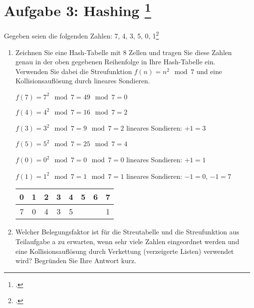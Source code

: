 \documentclass{lehramt-informatik-aufgabe}
\begin{document}
\section{Aufgabe 3: Hashing
\footcite[Seite 2]{aud:pu:5}
}

Gegeben seien die folgenden Zahlen: 7, 4, 3, 5, 0, 1\footcite[Frühjahr
2005, Thema 2 A 8]{examen:66112:2005:03}

\begin{enumerate}


\item Zeichnen Sie eine Hash-Tabelle mit 8 Zellen und tragen Sie diese
Zahlen genau in der oben gegebenen Reihenfolge in Ihre Hash-Tabelle ein.
Verwenden Sie dabei die Streufunktion $f(n) = n^2 \mod 7$ und eine
Kollisionsauflösung durch lineares Sondieren.

\begin{antwort}
{
\footnotesize
$f(7) = 7^2 \mod 7 = 49 \mod 7 = 0$

$f(4) = 4^2 \mod 7 = 16 \mod 7 = 2$

$f(3) = 3^2 \mod 7 = 9 \mod 7 = 2$ lineares Sondieren: $+1 = 3$

$f(5) = 5^2 \mod 7 = 25 \mod 7 = 4$

$f(0) = 0^2 \mod 7 = 0 \mod 7 = 0$ lineares Sondieren: $+1 = 1$

$f(1) = 1^2 \mod 7 = 1 \mod 7 = 1$ lineares Sondieren: $-1 = 0$, $-1 = 7$
}

\begin{tabular}{|c|c|c|c|c|c|c|c|}
\hline
0 & 1 & 2 & 3 & 4 & 5 & 6 & 7 \\\hline
7 & 0 & 4 & 3 & 5 &   &   & 1 \\\hline
\end{tabular}

\end{antwort}


\item Welcher Belegungsfaktor ist für die Streutabelle und die
Streufunktion aus Teilaufgabe a zu erwarten, wenn sehr viele Zahlen
eingeordnet werden und eine Kollisionsauflösung durch Verkettung
(verzeigerte Listen) verwendet wird? Begründen Sie Ihre Antwort kurz.

\end{enumerate}
\end{document}
